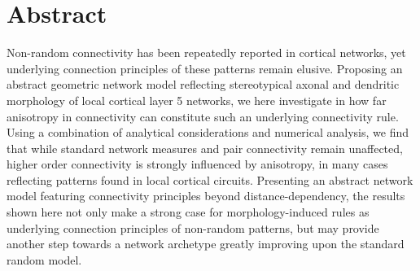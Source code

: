 \begingroup
\let\clearpage\relax
\let\cleardoublepage\relax
\let\cleardoublepage\relax

\chapter*{Abstract}

Non-random connectivity has been repeatedly reported in cortical
networks, yet underlying connection principles of these patterns
remain elusive. Proposing an abstract geometric network model
reflecting stereotypical axonal and dendritic morphology of local
cortical layer 5 networks, we here investigate in how far anisotropy
in connectivity can constitute such an underlying connectivity
rule. Using a combination of analytical considerations and numerical
analysis, we find that while standard network measures and pair
connectivity remain unaffected, higher order connectivity is strongly
influenced by anisotropy, in many cases reflecting patterns found in
local cortical circuits. Presenting an abstract network model
featuring connectivity principles beyond distance-dependency, the
results shown here not only make a strong case for morphology-induced
rules as underlying connection principles of non-random patterns, but
may provide another step towards a network archetype greatly improving
upon the standard random model.











\endgroup			

\vfill

